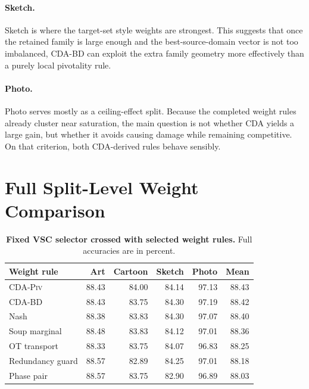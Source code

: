 \documentclass{article}
\theoremstyle{definition}
\newcommand{\piv}{\textup{\textsc{CDA-Piv}}}
\newcommand{\bd}{\textup{\textsc{CDA-BD}}}
\begin{document}
\paragraph{Sketch.}
Sketch is where the target-set style weights are strongest. This suggests that once the retained family is large enough and the best-source-domain vector is not too imbalanced, \bd{} can exploit the extra family geometry more effectively than a purely local pivotality rule.

\paragraph{Photo.}
Photo serves mostly as a ceiling-effect split. Because the completed weight rules already cluster near saturation, the main question is not whether CDA yields a large gain, but whether it avoids causing damage while remaining competitive. On that criterion, both CDA-derived rules behave sensibly.

\section{Full Split-Level Weight Comparison}

\begin{table}[h]
\centering
\caption{\textbf{Fixed VSC selector crossed with selected weight rules.} Full accuracies are in percent.}
\label{tab:all_weights}
\begin{tabular}{lrrrrr}
\toprule
Weight rule & Art & Cartoon & Sketch & Photo & Mean \\
\midrule
\piv{} & 88.43 & 84.00 & 84.14 & 97.13 & 88.43 \\
\bd{} & 88.43 & 83.75 & 84.30 & 97.19 & 88.42 \\
Nash & 88.38 & 83.83 & 84.30 & 97.07 & 88.40 \\
Soup marginal & 88.48 & 83.83 & 84.12 & 97.01 & 88.36 \\
OT transport & 88.33 & 83.75 & 84.07 & 96.83 & 88.25 \\
Redundancy guard & 88.57 & 82.89 & 84.25 & 97.01 & 88.18 \\
Phase pair & 88.57 & 83.75 & 82.90 & 96.89 & 88.03 \\
\bottomrule
\end{tabular}
\end{table}



\end{document}
